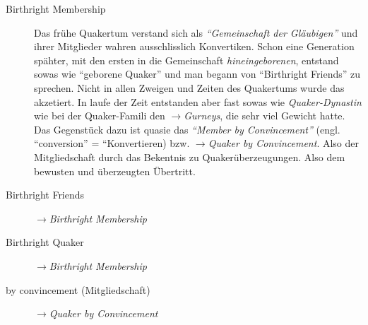\begin{description}
 \item[Birthright Membership] Das frühe Quakertum verstand sich als
\textit{"`Gemeinschaft der Gläubigen"'} und ihrer Mitglieder wahren
ausschlisslich Konvertiken. Schon eine Generation spähter, mit den ersten in die
Gemeinschaft \textit{hineingeborenen}, entstand sowas wie "`geborene Quaker"'
und man begann von "`Birthright Friends"' zu sprechen. Nicht in allen Zweigen
und Zeiten des Quakertums wurde das akzetiert. In laufe der Zeit entstanden aber
fast sowas wie \textit{Quaker-Dynastin} wie bei der Quaker-Famili den
$\to$\textit{Gurneys}, die sehr viel Gewicht hatte. Das Gegenstück dazu ist
quasie das \textit{"`Member by Convincement"'} (engl. ``conversion'' =
``Konvertieren) bzw. $\to$\textit{Quaker by Convincement}. Also der
Mitgliedschaft durch das Bekentnis zu Quakerüberzeugungen. Also dem bewusten und
überzeugten Übertritt.
 
 \item[Birthright Friends] $\to$\textit{Birthright Membership}
 
 \item[Birthright Quaker] $\to$\textit{Birthright Membership}


 \item[by convincement (Mitgliedschaft)] $\to$\textit{Quaker by Convincement}
 \end{description}

\normalsize

